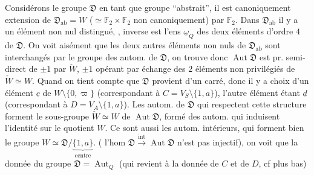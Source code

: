 Considérons le groupe $\mathfrak{D}$ en tant que groupe ``abstrait'', il est canoniquement extension de $\mathfrak{D}_{\mathrm{ab}}=W$ ($\simeq\mathbb{F}_2\times\mathbb{F}_2$ non canoniquement) par $\mathbb{F}_2$. Dans $\mathfrak{D}_{\mathrm{ab}}$ il y a un élément non nul distingué, \inserted{$\varpi$},  inverse est l'ens $\underline{\omega}_Q$ des deux éléments d'ordre $4$ de $\mathfrak{D}$. On voit aisément que les deux autres éléments non nuls de $\mathfrak{D}_{\mathrm{ab}}$ sont interchangés par le groupe des autom. de $\mathfrak{D}$, on trouve donc
$\operatorname{Aut}\mathfrak{D}$ est pr. semi-direct de $\pm1$ par $\check W$, $\pm1$ opérant par échange des $2$ éléments non  privilégiés de $\check W\simeq W$. Quand on tient compte que $\mathfrak{D}$ provient d'un carré, donc il y a choix d'un élément $\underline{c}$ de $W\setminus\{0,\varpi\}$ (correspondant  à $C=\!V_S\setminus\{1,a\}$), l'autre élément étant $\underline{d}$ (correspondant à $D=V_A\setminus\{1,a\}$).
Les autom. de $\mathfrak{D}$ qui respectent cette structure forment le sous-groupe $\check W\simeq W$ de $\operatorname{Aut}\mathfrak{D}$, formé des autom.  qui induisent l'identité sur le quotient $W$. Ce sont aussi les autom. intérieurs, qui forment bien le groupe $W\simeq\mathfrak{D}/\underbrace{\{1,a\}}_{\text{centre}}$. ( l'hom $\mathfrak{D}\xrightarrow{\mathrm{int}}\operatorname{Aut}\mathfrak{D}$ n'est pas injectif), on voit que la donnée du groupe $\mathfrak{D}=\operatorname{Aut}_Q$ (qui revient à la donnée de $C$ et de $D$, cf plus bas)

